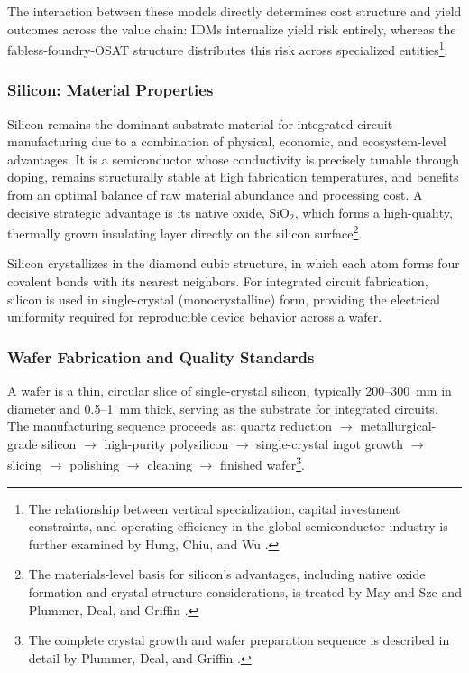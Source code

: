 \documentclass[10pt,a4paper]{article}
\begin{document}
The interaction between these models directly determines cost structure and 
yield outcomes across the value chain: IDMs internalize yield risk entirely, 
whereas the fabless-foundry-OSAT structure distributes this risk across 
specialized entities\footnote{The relationship between vertical specialization, 
capital investment constraints, and operating efficiency in the global 
semiconductor industry is further examined by Hung, Chiu, and Wu \cite{hung2017}.}.

\subsubsection{Silicon: Material Properties}

Silicon remains the dominant substrate material for integrated circuit 
manufacturing due to a combination of physical, economic, and ecosystem-level 
advantages. It is a semiconductor whose conductivity is precisely tunable 
through doping, remains structurally stable at high fabrication temperatures, 
and benefits from an optimal balance of raw material abundance and processing 
cost. A decisive strategic advantage is its native oxide, SiO$_2$, which forms 
a high-quality, thermally grown insulating layer directly on the silicon 
surface\footnote{The materials-level basis for silicon's advantages, including 
native oxide formation and crystal structure considerations, is treated by May 
and Sze \cite{maysze2004} and Plummer, Deal, and Griffin \cite{plummer2000}.}.

Silicon crystallizes in the diamond cubic structure, in which each atom forms 
four covalent bonds with its nearest neighbors. For integrated circuit 
fabrication, silicon is used in single-crystal (monocrystalline) form, 
providing the electrical uniformity required for reproducible device behavior 
across a wafer.

\subsubsection{Wafer Fabrication and Quality Standards}

A wafer is a thin, circular slice of single-crystal silicon, typically 200--300~mm 
in diameter and 0.5--1~mm thick, serving as the substrate for integrated 
circuits. The manufacturing sequence proceeds as: quartz reduction $\rightarrow$ 
metallurgical-grade silicon $\rightarrow$ high-purity polysilicon $\rightarrow$ 
single-crystal ingot growth $\rightarrow$ slicing $\rightarrow$ polishing 
$\rightarrow$ cleaning $\rightarrow$ finished wafer\footnote{The complete crystal 
growth and wafer preparation sequence is described in detail by Plummer, Deal, 
and Griffin \cite{plummer2000}.}.
\end{document}
